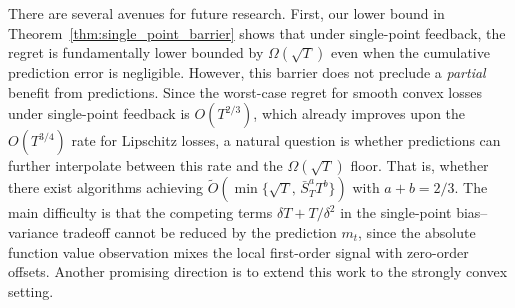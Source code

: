 \documentclass[journal,onecolumn]{IEEEtran}
\theoremstyle{plain}
\theoremstyle{definition}
\theoremstyle{remark}
\begin{document}
    There are several avenues for future research. First, our lower bound in Theorem~\ref{thm:single_point_barrier} shows that under single-point feedback, the regret is fundamentally lower bounded by  $\Omega( \sqrt{T})$ even when the cumulative prediction error is negligible. However, this barrier does not preclude a \emph{partial} benefit from predictions. Since the worst-case regret for smooth convex losses under single-point feedback is $O(T^{2/3})$, which already improves upon the $O(T^{3/4})$ rate for Lipschitz losses, a natural question is whether predictions can further interpolate between this rate and the $\Omega(\sqrt{T})$ floor. That is, whether there exist algorithms achieving $\widetilde{O}(\min\{\sqrt{T},\, \bar{S}_T^a T^b\})$ with $a + b = 2/3$. The main difficulty is that the competing terms $\delta T + T/\delta^2$ in the single-point bias--variance tradeoff cannot be reduced by the prediction $m_t$, since the absolute function value observation mixes the local first-order signal with zero-order offsets. Another promising direction is to extend this work to the strongly convex setting.

    \clearpage
    
\end{document}
